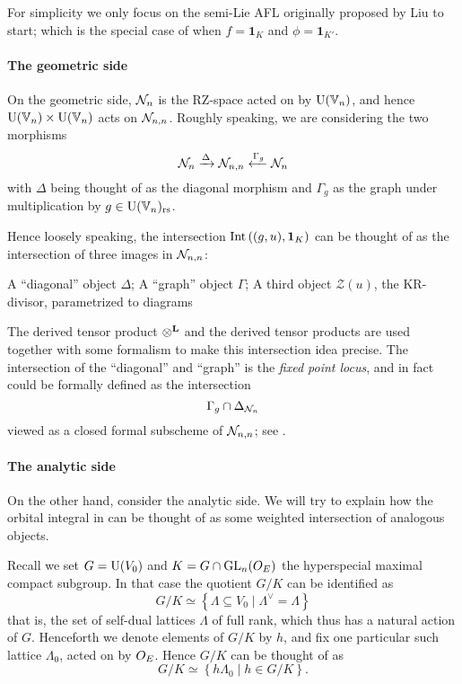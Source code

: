For simplicity we only focus on the semi-Lie AFL originally proposed by Liu to start;
which is the special case of 
when $f = \mathbf{1}_K$ and $\phi = \mathbf{1}_{K'}$.

\paragraph{The geometric side}
On the geometric side, $\mathcal N_n$ is the RZ-space acted on by $\operatorname{U}(\mathbb V_n)$,
and hence $\operatorname{U}(\mathbb V_n) \times \operatorname{U}(\mathbb V_n)$ acts on $\mathcal N_{n,n}$.
Roughly speaking, we are considering the two morphisms
\[ \mathcal N_n \xrightarrow{\Delta} \mathcal N_{n,n} \xleftarrow{\Gamma_g} \mathcal N_n \]
with $\Delta$ being thought of as the diagonal morphism
and $\Gamma_g$ as the graph under multiplication by $g \in \operatorname{U}(\mathbb V_n)_{\mathrm{rs}}$.

Hence loosely speaking, the intersection $\operatorname{Int}\left( (g,u), \mathbf{1}_K \right)$
can be thought of as the intersection of three images in $\mathcal N_{n,n}$:
\begin{itemize}
  \ii A ``diagonal'' object $\Delta$;
  \ii A ``graph'' object $\Gamma$;
  \ii A third object $\mathcal Z(u)$, the KR-divisor, parametrized to diagrams
  \begin{center}
  \end{center}
\end{itemize}
The derived tensor product $\mathop{\otimes}^{\mathbf{L}}$ and the derived tensor products
are used together with some formalism to make this intersection idea precise.
The intersection of the ``diagonal'' and ``graph'' is the \emph{fixed point locus},
and in fact could be formally defined as the intersection
\[ \Gamma_g \cap \Delta_{\mathcal N_n} \]
viewed as a closed formal subscheme of $\mathcal N_{n,n}$;
see \cite[equation (4.6)]{ref:survey}.

\paragraph{The analytic side}
On the other hand, consider the analytic side.
We will try to explain how the orbital integral in 
can be thought of as some weighted intersection of analogous objects.

Recall we set $G = \operatorname{U}(V_0)$ and $K = G \cap \operatorname{GL}_n(O_E)$
the hyperspecial maximal compact subgroup.
In that case the quotient $G/K$ can be identified as
\[ G/K \simeq \left\{ \Lambda \subseteq V_0 \mid \Lambda^\vee = \Lambda \right\} \]
that is, the set of self-dual lattices $\Lambda$ of full rank,
which thus has a natural action of $G$.
Henceforth we denote elements of $G/K$ by $h$,
and fix one particular such lattice $\Lambda_0$, acted on by $O_E$.
Hence $G/K$ can be thought of as
\[ G/K \simeq \left\{ h \Lambda_0 \mid h \in G/K \right\}. \]

